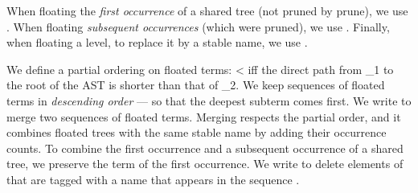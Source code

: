 When floating the \emph{first occurrence} of a shared tree (not pruned by \<prune\>), we use \<\float{}\>. When  floating \emph{subsequent occurrences} (which were pruned), we use \<\float{}\cdot\>. Finally, when floating a level, to replace it by a stable name, we use \<\float{}\ell\>.

We define a partial ordering on floated terms: \< < \> iff the direct path from \<\nu_1\> to the root of the AST is shorter than that of \<\nu_2\>. We keep sequences of floated terms in \emph{descending order} --- so that the deepest subterm comes first. We write \<\uplus{}\> to merge two sequences of floated terms. Merging respects the partial order, and it combines floated trees with the same stable name by adding their occurrence counts. To combine the first occurrence and a subsequent occurrence of a shared tree, we preserve the term of the first occurrence. We write \<\overline\Gamma\setminus\overline\nu\> to delete elements of \<\overline\Gamma\> that are tagged with a name that appears in the sequence \<\overline\nu\>.

